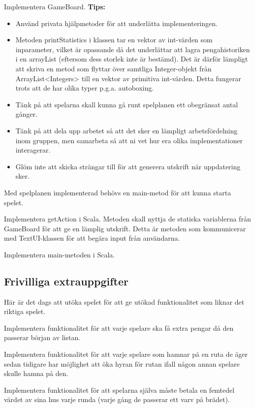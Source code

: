 \Subtask Implementera GameBoard.
\newline
\newline
\textbf{Tips:}

\begin{itemize}
\item Använd privata hjälpmetoder för att underlätta implementeringen.
\item Metoden printStatistics i klassen  tar en vektor av int-värden som inparameter, vilket är opassande då det underlättar att lagra pengahistoriken i en arrayList (eftersom dess storlek inte är bestämd). Det är därför lämpligt att skriva en metod som flyttar över samtliga Integer-objekt från ArrayList<Integers> till en vektor av primitiva int-värden. Detta fungerar trots att de har olika typer p.g.a. autoboxing. 
\item Tänk på att spelarna skall kunna gå runt spelplanen ett obegränsat antal gånger.
\item Tänk på att dela upp arbetet så att det sker en lämpligt arbetsfördelning inom gruppen, men samarbeta så att ni vet hur era olika implementationer interagerar.
\item Glöm inte att skicka strängar till   för att generera utskrift när uppdatering sker.
\end{itemize}

\Task Med spelplanen implementerad behövs en main-metod för att kunna starta spelet.  

\Subtask Implementera getAction i Scala. Metoden skall nyttja de statiska variablerna från GameBoard för att ge en lämplig utskrift. Detta är metoden som kommunicerar med TextUI-klassen för att begära input från användarna.

\Subtask Implementera main-metoden i Scala.




\subsection{Frivilliga extrauppgifter}

\Task Här är det dags att utöka spelet för att ge utökad funktionalitet som liknar det riktiga spelet.

\Subtask Implementera funktionalitet för att varje spelare ska få extra pengar då den passerar början av listan.

\Subtask Implementera funktionalitet för att varje spelare som hamnar på en ruta de äger sedan tidigare har möjlighet att öka hyran för rutan ifall någon annan spelare skulle hamna på den.

\Subtask Implementera funktionalitet för att spelarna själva måste betala en femtedel värdet av sina hus varje runda (varje gång de passerar ett varv på brädet).
    
